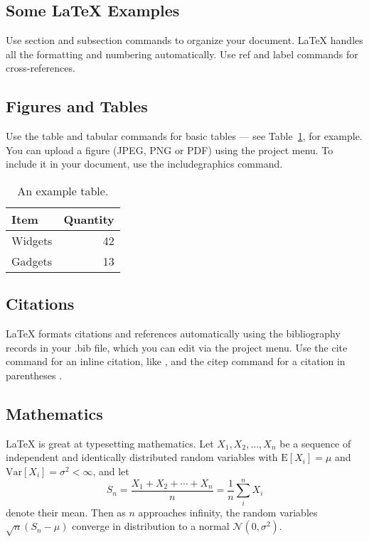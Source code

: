 \documentclass[fleqn,10pt]{wlpeerj}
\begin{document}
\newpage

\subsection*{Some \LaTeX{} Examples}
\label{sec:examples}

Use section and subsection commands to organize your document. \LaTeX{} handles all the formatting and numbering automatically. Use ref and label commands for cross-references.

\subsection*{Figures and Tables}

Use the table and tabular commands for basic tables --- see Table~\ref{tab:widgets}, for example. You can upload a figure (JPEG, PNG or PDF) using the project menu. To include it in your document, use the includegraphics command.

\begin{table}[ht]
	\centering
	\begin{tabular}{l|r}
		Item & Quantity \\\hline
		Widgets & 42 \\
		Gadgets & 13
	\end{tabular}
	\caption{\label{tab:widgets}An example table.}
\end{table}

\subsection*{Citations}

LaTeX formats citations and references automatically using the bibliography records in your .bib file, which you can edit via the project menu. Use the cite command for an inline citation, like \cite{Figueredo:2009dg}, and the citep command for a citation in parentheses \citep{Figueredo:2009dg}.

\subsection*{Mathematics}

\LaTeX{} is great at typesetting mathematics. Let $X_1, X_2, \ldots, X_n$ be a sequence of independent and identically distributed random variables with $\text{E}[X_i] = \mu$ and $\text{Var}[X_i] = \sigma^2 < \infty$, and let
$$S_n = \frac{X_1 + X_2 + \cdots + X_n}{n}
= \frac{1}{n}\sum_{i}^{n} X_i$$
denote their mean. Then as $n$ approaches infinity, the random variables $\sqrt{n}(S_n - \mu)$ converge in distribution to a normal $\mathcal{N}(0, \sigma^2)$.
\end{document}
